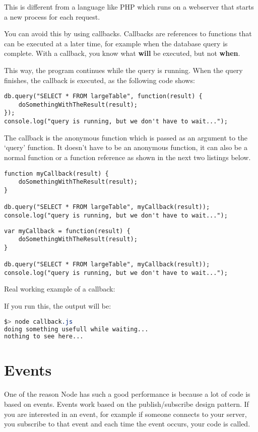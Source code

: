 \documentclass[a4paper]{report}
\begin{document}
This is different from a language like PHP which runs on a webserver that starts a new process for each request.

You can avoid this by using callbacks. Callbacks are references to functions that can be executed at a later time, for example when the database query is complete. With a callback, you know what \textbf{will} be executed, but not \textbf{when}.

This way, the program continues while the query is running. When the query finishes, the callback is executed, as the following code shows:

\begin{lstlisting}
db.query("SELECT * FROM largeTable", function(result) {
	doSomethingWithTheResult(result);
});
console.log("query is running, but we don't have to wait...");
\end{lstlisting}

\noindent The callback is the anonymous function which is passed as an argument to the `query' function. It doesn't have to be an anonymous function, it can also be a normal function or a function reference as shown in the next two listings below.

\begin{lstlisting}
function myCallback(result) {
	doSomethingWithTheResult(result);
}

db.query("SELECT * FROM largeTable", myCallback(result));
console.log("query is running, but we don't have to wait...");
\end{lstlisting}

\begin{lstlisting}
var myCallback = function(result) {
	doSomethingWithTheResult(result);
}

db.query("SELECT * FROM largeTable", myCallback(result));
console.log("query is running, but we don't have to wait...");
\end{lstlisting}

\noindent Real working example of a callback:

If you run this, the output will be:
\begin{lstlisting}[language=css]
$> node callback.js 
doing something usefull while waiting...
nothing to see here...
\end{lstlisting}

\section*{Events}
One of the reason Node has such a good performance is because a lot of code is based on events. Events work based on the publish/subscribe design pattern. If you are interested in an event, for example if someone connects to your server, you subscribe to that event and each time the event occurs, your code is called.
\end{document}
